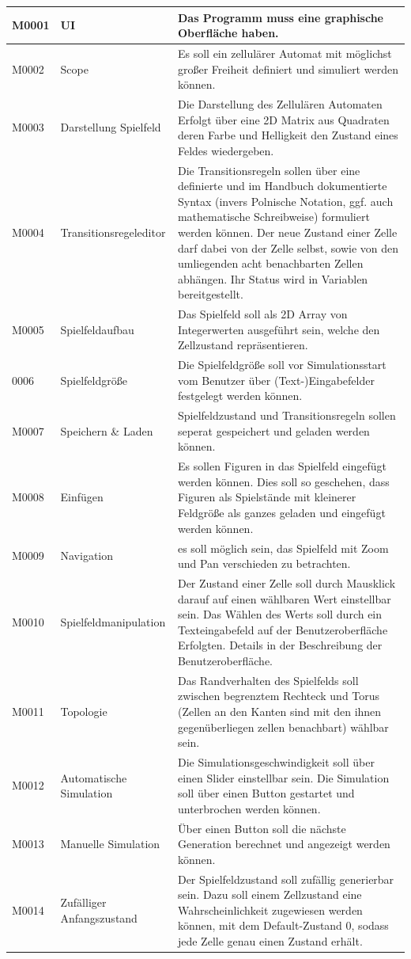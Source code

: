 \documentclass[11pt,a4paper]{article}
\begin{document}
\begin{longtable}[m]{|m{2.2cm}|m{4cm}|m{8cm}|}
\hline
M0001     & UI & Das Programm muss eine graphische Oberfläche haben.  \\
\hline
M0002 & Scope & Es soll ein zellulärer Automat mit möglichst großer Freiheit definiert und simuliert werden können.  \\
\hline
M0003 & Darstellung Spielfeld & Die Darstellung des Zellulären Automaten Erfolgt über eine 2D Matrix aus Quadraten deren Farbe und Helligkeit den Zustand eines Feldes wiedergeben. \\
\hline
M0004 & Transitionsregeleditor & Die Transitionsregeln sollen über eine definierte und im Handbuch dokumentierte Syntax (invers Polnische Notation, ggf. auch mathematische Schreibweise) formuliert werden können. Der neue Zustand einer Zelle darf dabei von der Zelle selbst, sowie von den umliegenden acht benachbarten Zellen abhängen. Ihr Status wird in Variablen bereitgestellt.\\
\hline
M0005 & Spielfeldaufbau & Das Spielfeld soll als 2D Array von Integerwerten ausgeführt sein, welche den Zellzustand repräsentieren.\\
\hline
0006 & Spielfeldgröße & Die Spielfeldgröße soll vor Simulationsstart vom Benutzer über (Text-)Eingabefelder festgelegt werden können.\\
\hline
M0007 & Speichern \& Laden & Spielfeldzustand und Transitionsregeln sollen seperat gespeichert und geladen werden können.  \\
\hline
M0008 & Einfügen & Es sollen Figuren in das Spielfeld eingefügt werden können. Dies soll so geschehen, dass Figuren als Spielstände mit kleinerer Feldgröße als ganzes geladen und eingefügt werden können. \\
\hline
M0009 & Navigation & es soll möglich sein, das Spielfeld mit Zoom und Pan verschieden zu betrachten. \\
\hline
M0010 & Spielfeldmanipulation & Der Zustand einer Zelle soll durch Mausklick darauf auf einen wählbaren Wert einstellbar sein. Das Wählen des Werts soll durch ein Texteingabefeld auf der Benutzeroberfläche Erfolgten. Details in der Beschreibung der Benutzeroberfläche.\\
\hline
M0011 & Topologie & Das Randverhalten des Spielfelds soll zwischen begrenztem Rechteck und Torus (Zellen an den Kanten sind mit den ihnen gegenüberliegen zellen benachbart) wählbar sein.\\
\hline
M0012 & Automatische Simulation & Die Simulationsgeschwindigkeit soll über einen Slider einstellbar sein. Die Simulation soll über einen Button gestartet und unterbrochen werden können.\\
\hline
M0013 & Manuelle Simulation & Über einen Button soll die nächste Generation berechnet und angezeigt werden können. \\
\hline
M0014 & Zufälliger Anfangszustand & Der Spielfeldzustand soll zufällig generierbar sein. Dazu soll einem Zellzustand eine Wahrscheinlichkeit zugewiesen werden können, mit dem Default-Zustand 0, sodass jede Zelle genau einen Zustand erhält.\\


\end{longtable}
\end{document}
